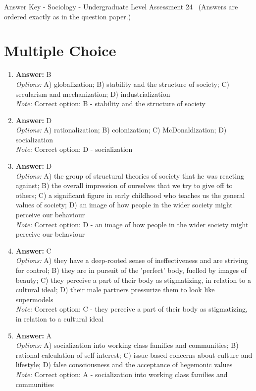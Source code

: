 \documentclass[12pt]{article}
\begin{document}
\begin{center}
Answer Key - Sociology - Undergraduate Level Assessment 24 \
\small (Answers are ordered exactly as in the question paper.)
\end{center}

\section*{Multiple Choice}
\begin{enumerate}[label=\arabic*.]
\item \textbf{Answer:} B
\\ \textit{Options:} A) globalization; B) stability and the structure of society; C) secularism and mechanization; D) industrialization
\\ \textit{Note:} Correct option: B - stability and the structure of society
\item \textbf{Answer:} D
\\ \textit{Options:} A) rationalization; B) colonization; C) McDonaldization; D) socialization
\\ \textit{Note:} Correct option: D - socialization
\item \textbf{Answer:} D
\\ \textit{Options:} A) the group of structural theories of society that he was reacting against; B) the overall impression of ourselves that we try to give off to others; C) a significant figure in early childhood who teaches us the general values of society; D) an image of how people in the wider society might perceive our behaviour
\\ \textit{Note:} Correct option: D - an image of how people in the wider society might perceive our behaviour
\item \textbf{Answer:} C
\\ \textit{Options:} A) they have a deep-rooted sense of ineffectiveness and are striving for control; B) they are in pursuit of the 'perfect' body, fuelled by images of beauty; C) they perceive a part of their body as stigmatizing, in relation to a cultural ideal; D) their male partners pressurize them to look like supermodels
\\ \textit{Note:} Correct option: C - they perceive a part of their body as stigmatizing, in relation to a cultural ideal
\item \textbf{Answer:} A
\\ \textit{Options:} A) socialization into working class families and communities; B) rational calculation of self-interest; C) issue-based concerns about culture and lifestyle; D) false consciousness and the acceptance of hegemonic values
\\ \textit{Note:} Correct option: A - socialization into working class families and communities
\end{enumerate}
\end{document}
